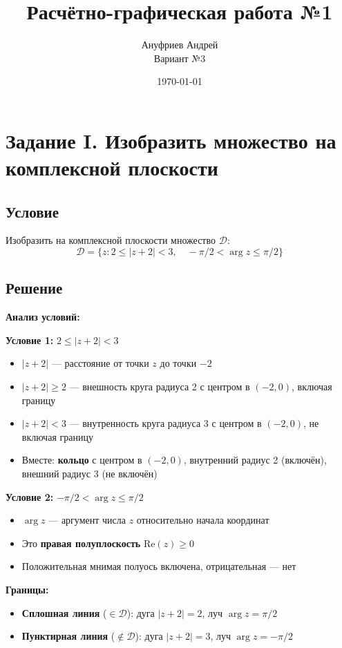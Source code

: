 \documentclass[12pt,a4paper]{article}
\title{\textbf{Расчётно-графическая работа №1 }}
\author{Ануфриев Андрей \\Вариант №3
}
\date{\today}
\begin{document}
\maketitle
\tableofcontents
\newpage

\section{Задание I.  Изобразить множество на комплексной плоскости}

\subsection{Условие}
Изобразить на комплексной плоскости множество $\mathcal{D}$:
\[
\mathcal{D} = \{z : 2 \leq |z + 2| < 3, \quad -\pi/2 < \arg z \leq \pi/2\}
\]

\subsection{Решение}

\textbf{Анализ условий:}

\textbf{Условие 1:} $2 \leq |z + 2| < 3$
\begin{itemize}
    \item $|z + 2|$ --- расстояние от точки $z$ до точки $-2$
    \item $|z + 2| \geq 2$ --- внешность круга радиуса 2 с центром в $(-2, 0)$, включая границу
    \item $|z + 2| < 3$ --- внутренность круга радиуса 3 с центром в $(-2, 0)$, не включая границу
    \item Вместе: \textbf{кольцо} с центром в $(-2, 0)$, внутренний радиус 2 (включён), внешний радиус 3 (не включён)
\end{itemize}

\textbf{Условие 2:} $-\pi/2 < \arg z \leq \pi/2$
\begin{itemize}
    \item $\arg z$ --- аргумент числа $z$ относительно начала координат
    \item Это \textbf{правая полуплоскость} $\text{Re}(z) \geq 0$
    \item Положительная мнимая полуось включена, отрицательная --- нет
\end{itemize}

\textbf{Границы:}
\begin{itemize}
    \item \textbf{Сплошная линия} ($\in \mathcal{D}$): дуга $|z+2| = 2$, луч $\arg z = \pi/2$
    \item \textbf{Пунктирная линия} ($\notin \mathcal{D}$): дуга $|z+2| = 3$, луч $\arg z = -\pi/2$
\end{itemize}
\end{document}
